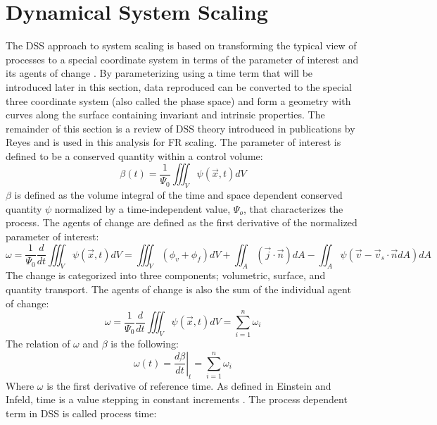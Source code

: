 \section{Dynamical System Scaling}
\label{sec:dssdoc}

The DSS approach to system scaling is based on transforming the typical view of processes to a special coordinate system in terms of the parameter of interest and its agents of change \cite{DSS2015}.
By parameterizing using a time term that will be introduced later in this section, data reproduced can be converted to the special three coordinate system (also called the phase space)
and form a geometry with curves along the surface containing invariant and intrinsic properties. The remainder of this section is a review of DSS theory introduced in publications
by Reyes \cite{DSS2015,Reyes2015,Martin2019} and is used in this analysis for FR scaling. The parameter of interest is defined to be a conserved quantity within a control volume:
\begin{equation}
  \label{eq_1}
  \beta(t)=\frac{1}{\Psi_{0}}\iiint_{V}{\psi\left(\vec{x},t\right)}dV
\end{equation}
$\beta$ is defined as the volume integral of the time and space dependent conserved quantity $\psi$ normalized by a time-independent value, $\Psi_{o}$, that characterizes the process. The agents of change are defined as the first derivative of the normalized parameter of interest:
\begin{equation}
  \label{eq_2}
  \omega=\frac{1}{\Psi_{0}}\frac{d}{dt}\iiint_{V}{\psi\left(\vec{x},t\right)}dV=\iiint_{V}{\left(\phi_{v}+\phi_{f}\right)}dV+\iint_{A}{\left(\vec{j}\cdot\vec{n}\right)}dA-\iint_{A}{\psi\left(\vec{v}-\vec{v}_{s}\cdot\vec{n}dA\right)}dA
\end{equation}
The change is categorized into three components; volumetric, surface, and quantity transport. The agents of change is also the sum of the individual agent of change:
\begin{equation}
  \omega=\frac{1}{\Psi_{0}}\frac{d}{dt}\iiint_{V}{\psi\left(\vec{x},t\right)}dV=\sum^{n}_{i=1}{\omega_{i}}
\end{equation}
The relation of $\omega$ and $\beta$ is the following:
\begin{equation}
  \label{eq_3}
  \omega(t)=\left.\frac{d\beta}{dt}\right|_{t}=\sum^{n}_{i=1}{\omega_{i}}
\end{equation}
Where $\omega$ is the first derivative of reference time. As defined in Einstein and Infeld, time is a value stepping in constant increments \cite{Einstein1966}. The process dependent term in DSS is called process time:
